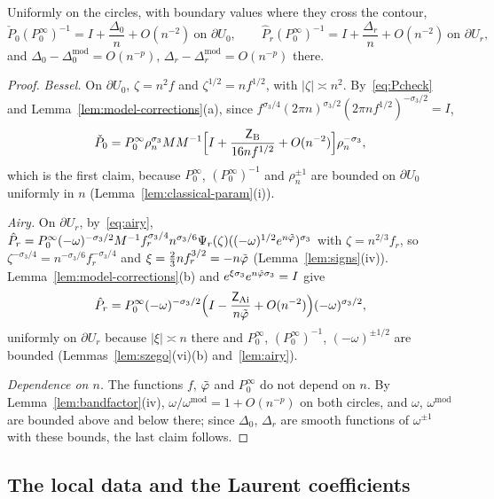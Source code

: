 \begin{lemma}\label{lem:circle-jumps}
Uniformly on the circles, with boundary values where they cross the contour,
\[
  \check P_0(P^\infty_0)^{-1}=I+\frac{\Delta_0}n+O(n^{-2})\ \text{on }\partial U_0,\qquad
  \hat P_r(P^\infty_0)^{-1}=I+\frac{\Delta_r}n+O(n^{-2})\ \text{on }\partial U_r,
\]
and $\Delta_0-\Delta_0^{\mathrm{mod}}=O(n^{-p})$, $\Delta_r-\Delta_r^{\mathrm{mod}}=O(n^{-p})$ there.
\end{lemma}

\begin{proof}
\emph{Bessel.} On $\partial U_0$, $\zeta=n^2f$ and $\zeta^{1/2}=nf^{1/2}$, with $|\zeta|\asymp n^2$. By~\eqref{eq:Pcheck} and
Lemma~\ref{lem:model-corrections}(a), since $f^{\sigma_3/4}(2\pi n)^{\sigma_3/2}(2\pi nf^{1/2})^{-\sigma_3/2}=I$,
\[
  \check P_0=P^\infty_0\rho_n^{\sigma_3}MM^{-1}\Bigl[I+\frac{\mathsf Z_{\mathrm B}}{16nf^{1/2}}+O(n^{-2})\Bigr]\rho_n^{-\sigma_3},
\]
which is the first claim, because $P^\infty_0$, $(P^\infty_0)^{-1}$ and $\rho_n^{\pm1}$ are bounded on $\partial U_0$
uniformly in $n$ (Lemma~\ref{lem:classical-param}(i)).

\emph{Airy.} On $\partial U_r$, by~\eqref{eq:airy}, $\hat P_r=P^\infty_0(-\omega)^{-\sigma_3/2}M^{-1}f_r^{\sigma_3/4}n^{\sigma_3/6}
\Psi_r(\zeta)((-\omega)^{1/2}e^{n\tilde\varphi})^{\sigma_3}$ with $\zeta=n^{2/3}f_r$, so $\zeta^{-\sigma_3/4}=n^{-\sigma_3/6}f_r^{-\sigma_3/4}$
and $\xi=\frac23nf_r^{3/2}=-n\tilde\varphi$ (Lemma~\ref{lem:signs}(iv)). Lemma~\ref{lem:model-corrections}(b) and
$e^{\xi\sigma_3}e^{n\tilde\varphi\sigma_3}=I$ give
\[
  \hat P_r=P^\infty_0(-\omega)^{-\sigma_3/2}\Bigl(I-\frac{\mathsf Z_{\mathrm{Ai}}}{n\tilde\varphi}+O(n^{-2})\Bigr)(-\omega)^{\sigma_3/2},
\]
uniformly on $\partial U_r$ because $|\xi|\asymp n$ there and $P^\infty_0$, $(P^\infty_0)^{-1}$, $(-\omega)^{\pm1/2}$ are bounded
(Lemmas~\ref{lem:szego}(vi)(b) and~\ref{lem:airy}).

\emph{Dependence on $n$.} The functions $f$, $\tilde\varphi$ and $P^\infty_0$ do not depend on $n$. By
Lemma~\ref{lem:bandfactor}(iv), $\omega/\omega^{\mathrm{mod}}=1+O(n^{-p})$ on both circles, and $\omega$, $\omega^{\mathrm{mod}}$
are bounded above and below there; since $\Delta_0$, $\Delta_r$ are smooth functions of $\omega^{\pm1}$ with these bounds,
the last claim follows.
\end{proof}

\subsection{The local data and the Laurent coefficients}\label{sec:second-laurent}

